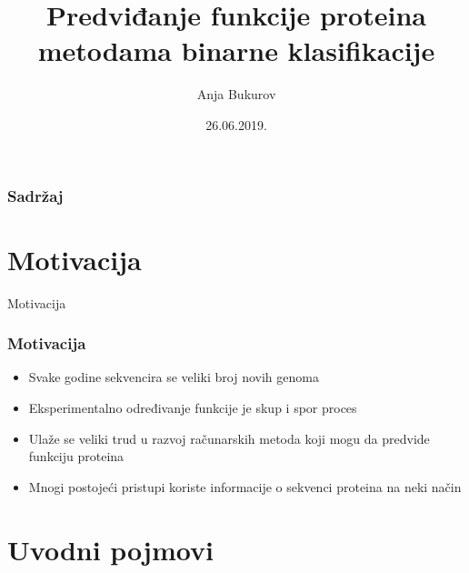 \documentclass{beamer}
\title{Predviđanje funkcije proteina metodama binarne klasifikacije}
\author{Anja Bukurov}
\institute{Matematički fakultet}
\date{26.06.2019.}
\begin{document}
 
\frame{\titlepage}

 
\begin{frame}
	\frametitle{Sadržaj}
	\tableofcontents
\end{frame}


\section{Motivacija}
\begin{frame}{Motivacija}
	\frametitle{Motivacija}

	\begin{itemize}
		\item Svake godine sekvencira se veliki broj novih genoma
		
		\item Eksperimentalno određivanje funkcije je skup i spor proces
		
		\item Ulaže se veliki trud u razvoj računarskih metoda koji mogu da predvide funkciju proteina
		
		\item Mnogi postojeći pristupi koriste informacije o sekvenci proteina na neki način
		
		
	\end{itemize}

\end{frame}
 

\section{Uvodni pojmovi}
\end{document}
